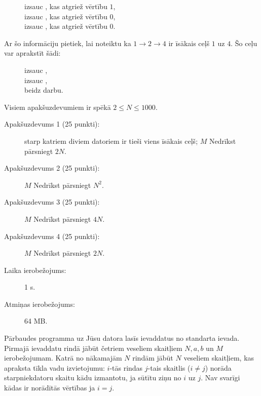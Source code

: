 \documentclass{boi2014-lv}
\begin{document}
    \begin{figure}[H]
        \centering
        izsauc , kas atgriež vērtību $1$, \\
        izsauc , kas atgriež vērtību $0$, \\
        izsauc , kas atgriež vērtību $0$.
    \end{figure}

		Ar šo informāciju pietiek, lai noteiktu ka $1 \to 2 \to 4$ ir īsākais ceļš $1$ uz $4$. Šo ceļu var aprakstīt šādi:

    \begin{figure}[H]
        \centering
        izsauc , \\
        izsauc , \\
         beidz darbu.
    \end{figure}

    \Scoring
    Visiem apakšuzdevumiem ir spēkā $2 \le N \le 1000$.

    \begin{description}

        \item[Apakšuzdevums 1 (25 punkti):] starp katriem diviem datoriem ir tieši viens īsākais ceļš; $M$ Nedrīkst pārsniegt $2N$.
        \item[Apakšuzdevums 2 (25 punkti):] $M$ Nedrīkst pārsniegt $N^2$.
        \item[Apakšuzdevums 3 (25 punkti):] $M$ Nedrīkst pārsniegt $4N$.
        \item[Apakšuzdevums 4 (25 punkti):] $M$ Nedrīkst pārsniegt $2N$.
    \end{description}

    \Constraints
    \begin{description}
        \item[Laika ierobežojums:] 1 s.
        \item[Atmiņas ierobežojums:] 64 MB.
    \end{description}

    \Experimentation
    Pārbaudes programma uz Jūsu datora lasīs ievaddatus no standarta ievada.
		Pirmajā ievaddatu rindā jābūt četriem veseliem skaitļiem $N, a, b$ un $M$ ierobežojumam.
		Katrā no nākamajām $N$ rindām jābūt $N$ veseliem skaitļiem, kas apraksta tīkla vadu izvietojumu:
		$i$-tās rindas $j$-tais skaitlis ($i \neq j$) norāda starpniekdatoru skaitu kādu izmantotu, ja
		sūtītu ziņu no $i$ uz $j$. Nav svarīgi kādas ir norādītās vērtības ja $i = j$.
\end{document}
